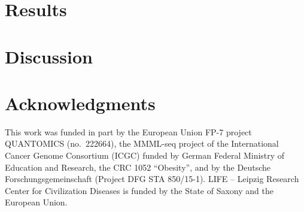 \documentclass[preprint,3p,times,twocolumn]{elsarticle}
\begin{document}

\section{Results}


\section{Discussion}



\section*{Acknowledgments}

This work was funded in part by the European Union FP-7 project QUANTOMICS
(no.\ 222664), the MMML-seq project of the International Cancer Genome
Consortium (ICGC) funded by German Federal Ministry of Education and
Research, the CRC 1052 ``Obesity'', and by the Deutsche
Forschungsgemeinschaft (Project DFG STA 850/15-1). LIFE -- Leipzig Research
Center for Civilization Diseases is funded by the State of Saxony and the
European Union.



\end{document}
